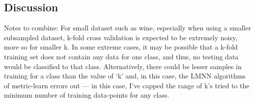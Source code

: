 \documentclass[5pt]{article}
\begin{document}
\subsection{Discussion}
Notes to combine: For small dataset such as wine, especially when using a
smaller subsampled dataset, k-fold cross validation is expected to be extremely
noisy, more so for smaller k. In some extreme cases, it may be possible that a
k-fold training set does not contain any data for one class, and thus, no
testing data would be classified to that class. Alternatively, there could be
lesser samples in training for a class than the value of `k' and, in this case,
the LMNN algorithms of metric-learn errors out --- in this case, I've capped
the range of k's tried to the minimum number of training data-points for any
class.
\end{document}
